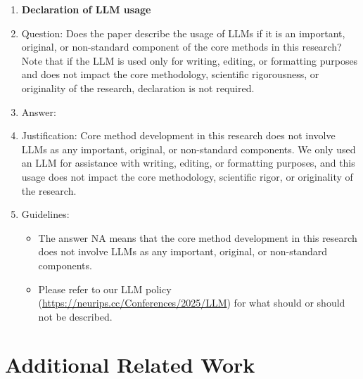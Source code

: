 \documentclass{article}
\theoremstyle{remark}
\begin{document}
\begin{enumerate}
\item {\bf Declaration of LLM usage}
    \item[] Question: Does the paper describe the usage of LLMs if it is an important, original, or non-standard component of the core methods in this research? Note that if the LLM is used only for writing, editing, or formatting purposes and does not impact the core methodology, scientific rigorousness, or originality of the research, declaration is not required.
    \item[] Answer: \answerNA{} %
    \item[] Justification: Core method development in this research does not involve LLMs as any important, original, or non-standard components. We only used an LLM for assistance with writing, editing, or formatting purposes, and this usage does not impact the core methodology, scientific rigor, or originality of the research.
    \item[] Guidelines:
    \begin{itemize}
        \item The answer NA means that the core method development in this research does not involve LLMs as any important, original, or non-standard components.
        \item Please refer to our LLM policy (\url{https://neurips.cc/Conferences/2025/LLM}) for what should or should not be described.
    \end{itemize}

\end{enumerate}

\newpage

\appendix

\section{Additional Related Work}\label{appendix:additional_related_work}
\end{document}

